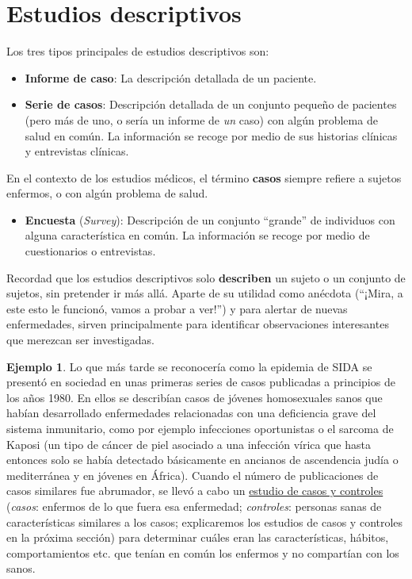 \documentclass[
]{book}
\providecommand{\tightlist}{%
  \setlength{\itemsep}{0pt}\setlength{\parskip}{0pt}}
\theoremstyle{definition}
\theoremstyle{definition}
\newtheorem{example}{Ejemplo}[chapter]
\theoremstyle{definition}
\theoremstyle{definition}
\theoremstyle{remark}
\begin{document}
\hypertarget{estudios-descriptivos}{%
\section{Estudios descriptivos}\label{estudios-descriptivos}}

Los tres tipos principales de estudios descriptivos son:

\begin{itemize}
\item
  \textbf{Informe de caso}: La descripción detallada de un paciente.
\item
  \textbf{Serie de casos}: Descripción detallada de un conjunto pequeño de pacientes (pero más de uno, o sería un informe de \emph{un} caso) con algún problema de salud en común. La información se recoge por medio de sus historias clínicas y entrevistas clínicas.
\end{itemize}

\begin{rmdrecordau}
En el contexto de los estudios médicos, el término \textbf{casos} siempre refiere a sujetos enfermos, o con algún problema de salud.
\end{rmdrecordau}

\begin{itemize}
\tightlist
\item
  \textbf{Encuesta} (\emph{Survey}): Descripción de un conjunto ``grande'' de individuos con alguna característica en común. La información se recoge por medio de cuestionarios o entrevistas.
\end{itemize}

Recordad que los estudios descriptivos solo \textbf{describen} un sujeto o un conjunto de sujetos, sin pretender ir más allá. Aparte de su utilidad como anécdota (``¡Mira, a este esto le funcionó, vamos a probar a ver!'') y para alertar de nuevas enfermedades, sirven principalmente para identificar observaciones interesantes que merezcan ser investigadas.

\begin{example}
\protect\hypertarget{exm:origenesHIV}{}\label{exm:origenesHIV}Lo que más tarde se reconocería como la epidemia de SIDA se presentó en sociedad en unas primeras series de casos publicadas a principios de los años 1980. En ellos se describían casos de jóvenes homosexuales sanos que habían desarrollado enfermedades relacionadas con una deficiencia grave del sistema inmunitario, como por ejemplo infecciones oportunistas o el sarcoma de Kaposi (un tipo de cáncer de piel asociado a una infección vírica que hasta entonces solo se había detectado básicamente en ancianos de ascendencia judía o mediterránea y en jóvenes en África). Cuando el número de publicaciones de casos similares fue abrumador, se llevó a cabo un \href{https://www.acpjournals.org/doi/abs/10.7326/0003-4819-99-2-145}{estudio de casos y controles} (\emph{casos}: enfermos de lo que fuera esa enfermedad; \emph{controles}: personas sanas de características similares a los casos; explicaremos los estudios de casos y controles en la próxima sección) para determinar cuáles eran las características, hábitos, comportamientos etc. que tenían en común los enfermos y no compartían con los sanos.
\end{example}
\end{document}

